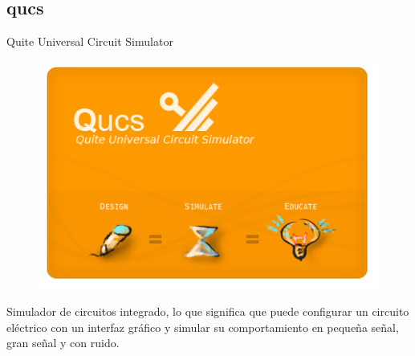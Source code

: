 \documentclass{beamer}
\begin{document}





\subsection[qucs - \url{http://qucs.sourceforge.net}]{qucs}

\begin{frame}{Quite Universal Circuit Simulator}
  \begin{figure}
    \centering
    \includegraphics[scale=0.4]{qucs/img/qucslogo4.png}
  \end{figure}
  Simulador de circuitos integrado, lo que significa que puede configurar un circuito eléctrico con un interfaz gráfico y simular su comportamiento en pequeña señal, gran señal y con ruido.
\end{frame}
\end{document}
